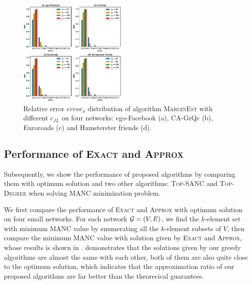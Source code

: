 \documentclass[sigconf]{acmart}
\begin{document}
\begin{figure}
    \centering
    \includegraphics[width=0.475\textwidth]{margin_errors.eps}
    \caption{Relative error \(error_u\) distribution of algorithm \textsc{MarginEst} with different \(c_{JL}\) on four networks: ego-Facebook (a), CA-GrQc (b), Euroroads (c) and Hamsterster friends (d).\label{pic:margin-error}}
\end{figure}

\subsection{Performance of \textsc{Exact} and \textsc{Approx}}

Subsequently, we show the performance of proposed algorithms by comparing them with optimum solution and two other algorithms: \textsc{Top-SANC} and \textsc{Top-Degree} when solving MANC minimization problem.

We first compare the performance of \textsc{Exact} and \textsc{Approx} with optimum solution on four small networks.
For each network \(\mathcal{G}=(V,E)\), we find the \(k\)-element set with minimum MANC value by enumerating all the \(k\)-element subsets of \(V\), then compare the minimum MANC value with solution given by \textsc{Exact} and \textsc{Approx}, whose results is shown in .
 demonstrates that the solutions given by our greedy algorithms are almost the same with each other, both of them are also quite close to the optimum solution, which indicates that the approximation ratio of our proposed algorithms are far better than the theorecical guarantees.
\end{document}
